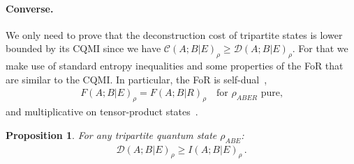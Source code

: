 \documentclass[a4paper,aps,prl,twocolumn,10pt,superscriptaddress]{revtex4-1}
\theoremstyle{plain}
\newtheorem{prop}[lemma]{Proposition}
\theoremstyle{definition}
\begin{document}
\paragraph{Converse.} We only need to prove that the deconstruction cost of tripartite states is lower bounded by its CQMI since we have $\mathcal{C}(A;B|E)_\rho\geq\mathcal{D}(A;B|E)_\rho$. For that we make use of standard entropy inequalities and some properties of the FoR that are similar to the CQMI. In particular, the FoR is self-dual~\cite[Prop.~4]{SW14},
\begin{align}\label{eq:duality-FoR}
F(A;B|E)_{\rho}=F(A;B|R)_{\rho}\quad\text{for $\rho_{ABER}$ pure,}
\end{align}
and multiplicative on tensor-product states~\cite[Prop.~2]{BT15}. 

\begin{prop}\label{prop:CQMI-lower-bnd}
For any tripartite quantum state $\rho_{ABE}$:
\begin{align*}
\mathcal{D}(A;B|E)_\rho\geq I(A;B|E)_{\rho}\,.
\end{align*}
\end{prop}
\end{document}
